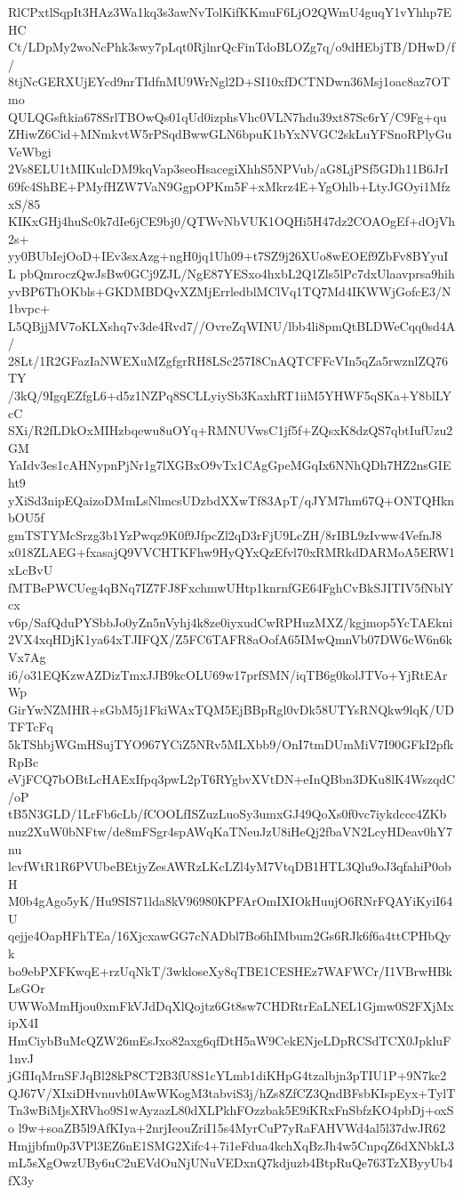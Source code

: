 RlCPxtlSqpIt3HAz3Wa1kq3s3awNvTolKifKKmuF6LjO2QWmU4guqY1vYhhp7EHC
Ct/LDpMy2woNcPhk3swy7pLqt0RjlnrQcFinTdoBLOZg7q/o9dHEbjTB/DHwD/f/
8tjNcGERXUjEYcd9nrTIdfnMU9WrNgl2D+SI10xfDCTNDwn36Msj1oac8az7OTmo
QULQGsftkia678SrlTBOwQs01qUd0izphsVhc0VLN7hdu39xt87Sc6rY/C9Fg+qu
ZHiwZ6Cid+MNmkvtW5rPSqdBwwGLN6bpuK1bYxNVGC2skLuYFSnoRPlyGuVeWbgi
2Vs8ELU1tMIKulcDM9kqVap3seoHsacegiXhhS5NPVub/aG8LjPSf5GDh11B6JrI
69fc4ShBE+PMyfHZW7VaN9GgpOPKm5F+xMkrz4E+YgOhlb+LtyJGOyi1MfzxS/85
KIKxGHj4huSc0k7dIe6jCE9bj0/QTWvNbVUK1OQHi5H47dz2COAOgEf+dOjVh2s+
yy0BUbIejOoD+IEv3sxAzg+ngH0jq1Uh09+t7SZ9j26XUo8wEOEf9ZbFv8BYyuIL
pbQmroczQwJsBw0GCj9ZJL/NgE87YESxo4hxbL2Q1Zls5lPc7dxUlaavprsa9hih
yvBP6ThOKbls+GKDMBDQvXZMjErrledblMClVq1TQ7Md4IKWWjGofcE3/N1bvpc+
L5QBjjMV7oKLXshq7v3de4Rvd7//OvreZqWINU/lbb4li8pmQtBLDWeCqq0sd4A/
28Lt/1R2GFazIaNWEXuMZgfgrRH8LSc257I8CnAQTCFFcVIn5qZa5rwznlZQ76TY
/3kQ/9IgqEZfgL6+d5z1NZPq8SCLLyiySb3KaxhRT1iiM5YHWF5qSKa+Y8blLYcC
SXi/R2fLDkOxMIHzbqewu8uOYq+RMNUVwsC1jf5f+ZQsxK8dzQS7qbtIufUzu2GM
YaIdv3es1cAHNypnPjNr1g7lXGBxO9vTx1CAgGpeMGqIx6NNhQDh7HZ2nsGIEht9
yXiSd3nipEQaizoDMmLsNlmcsUDzbdXXwTf83ApT/qJYM7hm67Q+ONTQHknbOU5f
gmTSTYMcSrzg3b1YzPwqz9K0f9JfpcZl2qD3rFjU9LcZH/8rIBL9zIvww4VefnJ8
x018ZLAEG+fxasajQ9VVCHTKFhw9HyQYxQzEfvl70xRMRkdDARMoA5ERW1xLcBvU
fMTBePWCUeg4qBNq7IZ7FJ8FxchmwUHtp1knrnfGE64FghCvBkSJITIV5fNblYcx
v6p/SafQduPYSbbJo0yZn5nVyhj4k8ze0iyxudCwRPHuzMXZ/kgjmop5YcTAEkni
2VX4xqHDjK1ya64xTJIFQX/Z5FC6TAFR8aOofA65IMwQmnVb07DW6cW6n6kVx7Ag
i6/o31EQKzwAZDizTmxJJB9kcOLU69w17prfSMN/iqTB6g0kolJTVo+YjRtEArWp
GirYwNZMHR+sGbM5j1FkiWAxTQM5EjBBpRgl0vDk58UTYsRNQkw9lqK/UDTFTcFq
5kTShbjWGmHSujTYO967YCiZ5NRv5MLXbb9/OnI7tmDUmMiV7I90GFkI2pfkRpBc
eVjFCQ7bOBtLcHAExIfpq3pwL2pT6RYgbvXVtDN+eInQBbn3DKu8lK4WszqdC/oP
tB5N3GLD/1LrFb6cLb/fCOOLfISZuzLuoSy3umxGJ49QoXs0f0vc7iykdccc4ZKb
nuz2XuW0bNFtw/de8mFSgr4spAWqKaTNeuJzU8iHeQj2fbaVN2LcyHDeav0hY7nu
lcvfWtR1R6PVUbeBEtjyZesAWRzLKcLZl4yM7VtqDB1HTL3Qlu9oJ3qfahiP0obH
M0b4gAgo5yK/Hu9SIS71lda8kV96980KPFArOmIXIOkHuujO6RNrFQAYiKyiI64U
qejje4OapHFhTEa/16XjcxawGG7cNADbl7Bo6hIMbum2Gs6RJk6f6a4ttCPHbQyk
bo9ebPXFKwqE+rzUqNkT/3wkloseXy8qTBE1CESHEz7WAFWCr/I1VBrwHBkLsGOr
UWWoMmHjou0xmFkVJdDqXlQojtz6Gt8sw7CHDRtrEaLNEL1Gjmw0S2FXjMxipX4I
HmCiybBuMcQZW26mEsJxo82axg6qfDtH5aW9CekENjeLDpRCSdTCX0JpkluF1nvJ
jGfIIqMrnSFJqBl28kP8CT2B3fU8S1cYLmb1diKHpG4tzalbjn3pTIU1P+9N7kc2
QJ67V/XIxiDHvnuvh0IAwWKogM3tabviS3j/hZs8ZfCZ3QndBFsbKIspEyx+TylT
Tn3wBiMjsXRVho9S1wAyzazL80dXLPkhFOzzbak5E9iKRxFnSbfzKO4pbDj+oxSo
l9w+soaZB5l9AfKIya+2nrjIeouZriI15s4MyrCuP7yRaFAHVWd4al5l37dwJR62
Hmjjbfm0p3VPl3EZ6nE1SMG2Xifc4+7i1eFdua4kchXqBzJh4w5CnpqZ6dXNbkL3
mL5sXgOwzUBy6uC2uEVdOuNjUNuVEDxnQ7kdjuzb4BtpRuQe763TzXByyUb4fX3y
